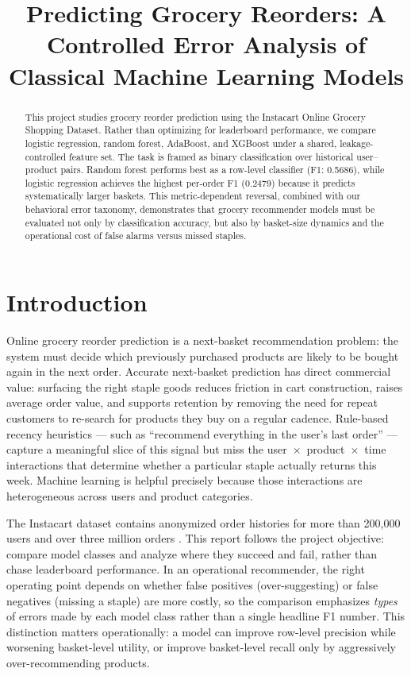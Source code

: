 \documentclass[10pt,twocolumn]{article}
\title{\vspace{-0.4in}Predicting Grocery Reorders: A Controlled Error Analysis of Classical Machine Learning Models}
\author{}
\date{}
\begin{document}
\maketitle

\begin{abstract}
This project studies grocery reorder prediction using the Instacart Online Grocery Shopping Dataset. Rather than optimizing for leaderboard performance, we compare logistic regression, random forest, AdaBoost, and XGBoost under a shared, leakage-controlled feature set. The task is framed as binary classification over historical user--product pairs. Random forest performs best as a row-level classifier (F1: 0.5686), while logistic regression achieves the highest per-order F1 (0.2479) because it predicts systematically larger baskets. This metric-dependent reversal, combined with our behavioral error taxonomy, demonstrates that grocery recommender models must be evaluated not only by classification accuracy, but also by basket-size dynamics and the operational cost of false alarms versus missed staples.
\end{abstract}

\section{Introduction}

Online grocery reorder prediction is a next-basket recommendation problem: the system must decide which previously purchased products are likely to be bought again in the next order. Accurate next-basket prediction has direct commercial value: surfacing the right staple goods reduces friction in cart construction, raises average order value, and supports retention by removing the need for repeat customers to re-search for products they buy on a regular cadence. Rule-based recency heuristics --- such as ``recommend everything in the user's last order'' --- capture a meaningful slice of this signal but miss the user~$\times$~product~$\times$~time interactions that determine whether a particular staple actually returns this week. Machine learning is helpful precisely because those interactions are heterogeneous across users and product categories.

The Instacart dataset contains anonymized order histories for more than 200,000 users and over three million orders \citep{instacart2017dataset,kaggle2017instacart}. This report follows the project objective: compare model classes and analyze where they succeed and fail, rather than chase leaderboard performance. In an operational recommender, the right operating point depends on whether false positives (over-suggesting) or false negatives (missing a staple) are more costly, so the comparison emphasizes \emph{types} of errors made by each model class rather than a single headline F1 number. This distinction matters operationally: a model can improve row-level precision while worsening basket-level utility, or improve basket-level recall only by aggressively over-recommending products.
\end{document}
